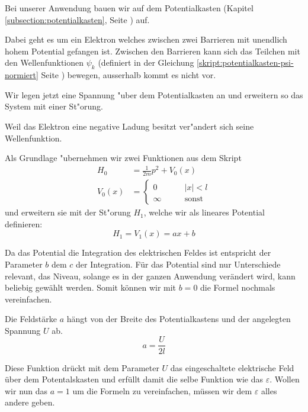 \begin{refsection}
Bei unserer Anwendung bauen wir auf dem Potentialkasten (Kapitel \ref{subsection:potentialkasten}, Seite \pageref{subsection:potentialkasten}) auf.

Dabei geht es um ein Elektron welches zwischen zwei Barrieren mit unendlich hohem Potential gefangen ist.
Zwischen den Barrieren kann sich das Teilchen mit den Wellenfunktionen $\psi_k$ 
(definiert in der Gleichung \ref{skript:potentialkasten-psi-normiert} Seite \pageref{skript:potentialkasten-psi-normiert}) bewegen,
ausserhalb kommt es nicht vor.

Wir legen jetzt eine Spannung "uber dem Potentialkasten an
und erweitern so das System mit einer St"orung.

Weil das Elektron eine negative Ladung besitzt ver"andert sich seine Wellenfunktion.

Als Grundlage "ubernehmen wir zwei Funktionen aus dem Skript
\begin{equation}
\begin{aligned}
H_0&=\frac1{2m}p^2+V_0(x)
\\
V_0(x)&=
  \begin{cases}
    0       & \qquad |x|<l\\
    \infty  & \qquad\text{sonst}
  \end{cases}
\end{aligned}
\end{equation}
und erweitern sie mit der St"orung $H_1$, welche wir als lineares 
Potential definieren:
\begin{equation}
  H_1 = V_1(x) = a x + b
\end{equation}


Da das Potential die Integration des elektrischen Feldes ist entspricht der Parameter $b$ dem $c$ der Integration.
F\"ur das Potential sind nur Unterschiede relevant, das Niveau, solange es in der ganzen Anwendung ver\"andert wird,
kann beliebig gew\"ahlt werden. Somit k\"onnen wir mit $b=0$ die Formel nochmals vereinfachen.

Die Feldst\"arke $a$ h\"angt von der Breite des Potentialkastens und der angelegten Spannung $U$ ab.
\[
  a = \frac{ U }{2 l}
\]

Diese Funktion dr\"uckt mit dem Parameter $U$ das eingeschaltete elektrische Feld \"uber dem Potentalskasten
und erf\"ullt damit die selbe Funktion wie das $\varepsilon$.
Wollen wir nun das $a = 1$ um die Formeln zu vereinfachen, m\"ussen wir dem $\varepsilon$ alles andere geben.


\end{refsection}
